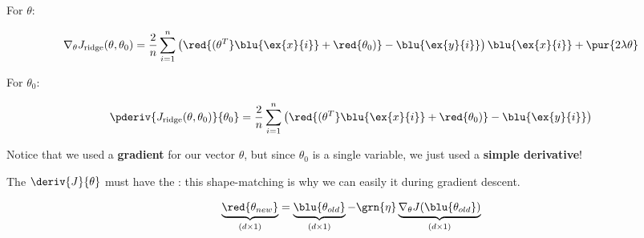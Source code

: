         For $\theta$:
        
        \begin{equation}
            \nabla_\theta J_\text{ridge}(\theta, \theta_0)
            =
            \frac{2}{n}\sum_{i=1}^n
            \left(
                \red{(\theta^T} \blu{\ex{x}{i}} + \red{\theta_0)}
                - 
                \blu{\ex{y}{i}}
            \right)
            \blu{\ex{x}{i}}
            +
            \pur{2 \lambda \theta}
        \end{equation}
        
        For $\theta_0$:
        
        \begin{equation}
            \pderiv{J_\text{ridge}(\theta, \theta_0)}{\theta_0} 
            =
            \frac{2}{n}\sum_{i=1}^n
            \left(
                \red{(\theta^T} \blu{\ex{x}{i}} + \red{\theta_0)}
                - 
                \blu{\ex{y}{i}}
            \right)
        \end{equation}
        
        Notice that we used a \textbf{gradient} for our vector $\theta$, but since $\theta_0$ is a single variable, we just used a \textbf{simple derivative}!\\
        
        \begin{concept}
            The  $\deriv{J}{\theta}$ must have the : this shape-matching is why we can easily  it during gradient descent.
            
            \begin{equation*}
                \underbrace{
                    \red{ \theta_{new} } 
                }_{(d \times 1)}
                =  
                \underbrace{
                    \blu{ \theta_{old} } 
                }_{(d \times 1)}
                - \grn{ \eta } 
                \underbrace{
                    \nabla_\theta J ( \blu{ \theta_{old} } )
                }_{(d \times 1)}
            \end{equation*}
        \end{concept}